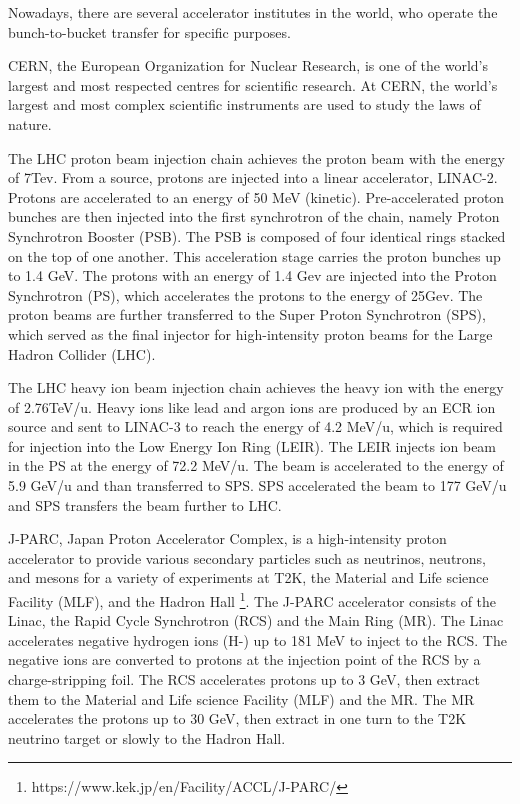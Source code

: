 Nowadays, there are several accelerator institutes in the world, who operate the bunch-to-bucket transfer for specific purposes. 

CERN, the European Organization for Nuclear Research, is one of the world's largest and most respected centres for scientific research.  At CERN, the world’s largest and most complex scientific instruments are used to study the laws of nature. 

The LHC proton beam injection chain achieves the proton beam with the energy of 7Tev. From a source, protons are injected into a linear accelerator, LINAC-2. Protons are accelerated to an energy of 50 MeV (kinetic). Pre-accelerated proton bunches are then injected into the first synchrotron of the chain, namely Proton Synchrotron Booster (PSB). The PSB is composed of four identical rings stacked on the top of one another. This acceleration stage carries the proton bunches up to 1.4 GeV. The protons with an energy of 1.4 Gev are injected into the Proton Synchrotron (PS), which accelerates the protons to the energy of 25Gev. The proton beams are further transferred to the Super Proton Synchrotron (SPS), which served as the final injector for high-intensity proton beams for the Large Hadron Collider (LHC).

The LHC heavy ion beam injection chain achieves the heavy ion with the energy of 2.76TeV/u. Heavy ions like lead and argon ions are produced by an ECR ion source and sent to LINAC-3 to reach the energy of 4.2
MeV/u, which is required for injection into the Low Energy Ion Ring (LEIR). The LEIR injects ion beam in the PS at the energy of 72.2 MeV/u. The beam is accelerated to the energy of 5.9 GeV/u and than transferred to SPS. SPS accelerated the beam to 177 GeV/u and SPS transfers the beam further to LHC.

J-PARC, Japan Proton Accelerator Complex, is a high-intensity proton accelerator to provide various secondary particles such as neutrinos, neutrons, and mesons for a variety of experiments at T2K, the Material and Life science Facility (MLF), and the Hadron Hall \footnote{https://www.kek.jp/en/Facility/ACCL/J-PARC/}.  The J-PARC accelerator consists of the Linac, the Rapid Cycle Synchrotron (RCS) and the Main Ring (MR). The Linac accelerates negative hydrogen ions (H-) up to 181 MeV to inject to the RCS. The negative ions are converted to protons at the injection point of the RCS by a charge-stripping foil. The RCS accelerates protons up to 3 GeV, then extract them to the Material and Life science Facility (MLF) and the MR. The MR accelerates the protons up to 30 GeV, then extract in one turn to the T2K neutrino target or slowly to the Hadron Hall. 

